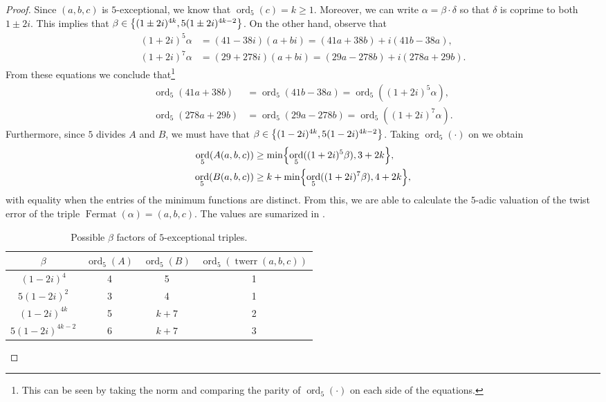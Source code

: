 \documentclass[12pt]{amsart}
\numberwithin{equation}{section} %
\theoremstyle{definition} \newtheorem{definition}[counter]{Definition}
\theoremstyle{remark} \newtheorem{nonexam}[counter]{Non-example}
\newcommand{\brk}[1]{\left\lbrace #1 \right\rbrace} %
\let\originalleft\left \let\originalright\right
\renewcommand{\left}{\mathopen{}\mathclose\bgroup\originalleft}
\renewcommand{\right}{\aftergroup\egroup\originalright}
\DeclareMathOperator{\ord}{ord} %
\DeclareMathOperator{\twerr}{twerr} %
\DeclareMathOperator{\Fermat}{Fermat} %
\begin{document}
\begin{proof}
  Since $(a,b,c)$ is $5$-exceptional, we know that $\ord_5(c) = k \geq 1$.
  Moreover, we can write $\alpha = \beta\cdot \delta$ so that $\delta$ is
  coprime to both $1\pm 2i$. This implies that $\beta \in \brk{(1\pm 2i)^{4k},
    5(1\pm 2i)^{4k-2}}$. On the other hand, observe that
  \begin{align}
   \label{eq:(1+2i)^5}
    (1+2i)^5  \alpha &= (41-38i)(a+bi) = (41a + 38b) + i(41b - 38a), \\
    \label{eq:(1+2i)^7}
        (1+2i)^7  \alpha &= (29+278i)(a+bi) = (29a -278b) + i(278a + 29b).
  \end{align}
  From these equations we conclude that\footnote{This can be seen by taking the
    norm and comparing the parity of $\ord_5(\cdot)$ on each side of the
    equations.}
  \begin{align*}
    \ord_5(41a + 38b) &= \ord_5(41b - 38a) = \ord_5((1+2i)^5\alpha), \\
    \ord_5(278a + 29b) &= \ord_5(29a -278b) = \ord_5((1+2i)^7\alpha).
  \end{align*}
  Furthermore, since $5$ divides $A$ and $B$, we must have that
  $\beta \in \brk{(1- 2i)^{4k}, 5(1-2i)^{4k-2}}$. Taking $\ord_5(\cdot)$ on
   we obtain
  \begin{align}
    \label{eq:ord-5-A}
    \ord_5(A(a,b,c)) &\geq \min\brk{\ord_5((1+2i)^5\beta), 3+2k}, \\
    \label{eq:ord-5-B}
    \ord_5(B(a,b,c)) &\geq k + \min\brk{\ord_5((1+2i)^7\beta), 4+2k},
  \end{align}
  with equality when the entries of the minimum functions are distinct. From
  this, we are able to calculate the $5$-adic valuation of the twist error of
  the triple $\Fermat(\alpha) = (a,b,c)$. The values are sumarized in
  .

  \begin{table}[ht]
    \begin{tabular}{|c|c|c|c|}
      \hline
      $\beta$          & $\ord_5(A)$ & $\ord_5(B)$ & $\ord_5(\twerr(a,b,c))$ \\\hline
      $(1-2i)^4$       & 4           & 5           & 1                       \\ \hline
      $5(1-2i)^2$      & 3           & 4           & 1                       \\ \hline
      $(1-2i)^{4k}$    & 5           & $k+7$       & 2                       \\ \hline
      $5(1-2i)^{4k-2}$ & 6           & $k+7$       & 3                       \\ \hline
    \end{tabular}
    \caption{Possible $\beta$ factors of $5$-exceptional triples.}
  \label{table:beta-ord-5}
  \end{table}
\end{proof}
  
\end{document}
